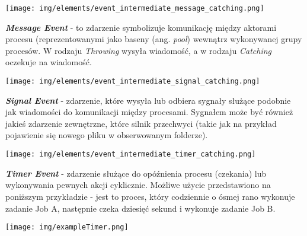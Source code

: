 \documentclass[declaration,shortabstract,mgr]{iithesis}
\begin{document}
\vspace{\mypointsep}

\noindent\begin{minipage}[t]{0.075\textwidth}\vspace{0pt}
\texttt{[image: img/elements/event\_intermediate\_message\_catching.png]}
\end{minipage}\hfill
\begin{minipage}[t]{0.875\textwidth}\vspace{0pt}
\textbf{\textit{Message Event}} - to zdarzenie symbolizuje komunikację między aktorami procesu (reprezentowanymi jako baseny (ang. \textit{pool}) wewnątrz wykonywanej grupy procesów. W rodzaju \textit{Throwing} wysyła wiadomość, a w rodzaju \textit{Catching} oczekuje na wiadomość.
\end{minipage}

\vspace{\mypointsep}

\noindent\begin{minipage}[t]{0.075\textwidth}\vspace{0pt}
\texttt{[image: img/elements/event\_intermediate\_signal\_catching.png]}
\end{minipage}\hfill
\begin{minipage}[t]{0.875\textwidth}\vspace{0pt}
\textbf{\textit{Signal Event}} - zdarzenie, które wysyła lub odbiera sygnały służące podobnie jak wiadomości do komunikacji między procesami. Sygnałem może być również jakieś zdarzenie zewnętrzne, które silnik przechwyci (takie jak na przykład pojawienie się nowego pliku w obserwowanym folderze).
\end{minipage}

\vspace{\mypointsep}

\noindent\begin{minipage}[t]{0.075\textwidth}\vspace{0pt}
\texttt{[image: img/elements/event\_intermediate\_timer\_catching.png]}
\end{minipage}\hfill
\begin{minipage}[t]{0.875\textwidth}\vspace{0pt}
\textbf{\textit{Timer Event}} - zdarzenie służące do opóźnienia procesu (czekania) lub wykonywania pewnych akcji cyklicznie. Możliwe użycie przedstawiono na poniższym przykładzie - jest to proces, który codziennie o ósmej rano wykonuje zadanie Job A, następnie czeka dziesięć sekund i wykonuje zadanie Job B.
\begin{center}
\texttt{[image: img/exampleTimer.png]}
\end{center}
\end{minipage}
\end{document}
